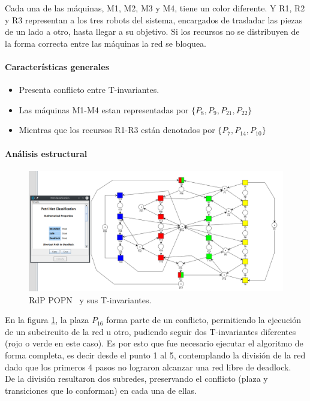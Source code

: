 Cada una de las máquinas, M1, M2, M3 y M4, tiene un color diferente. Y R1, R2 y R3 representan a los tres robots del sistema, encargados de trasladar las piezas de un lado a otro, hasta llegar a su objetivo. Si los recursos no se distribuyen de la forma correcta entre las máquinas la red se bloquea.

\paragraph{Características generales}
    \begin{itemize}
        \item Presenta conflicto entre T-invariantes.
        \item Las máquinas M1-M4 estan representadas por $\{P_8, P_9, P_{21}, P_{22}\}$
        \item Mientras que los recursos R1-R3 están denotados por $\{P_7, P_{14}, P_{10}\}$
    \end{itemize}
   
\paragraph{Análisis estructural}
\hfill \break

\begin{figure}[H]
	\centering
	\includegraphics[width=\textwidth]{Figures/algoritmo3/POP1.png}
	\caption[RdP POPN y sus T-invariantes.]{RdP POPN \footnotemark \ y sus T-invariantes.}
	\label{fig:popntinvariantes}
 \end{figure} 

En la figura \ref{fig:popntinvariantes}, la plaza $P_{16}$ forma parte de un conflicto, permitiendo la ejecución de un subcircuito de la red u otro, pudiendo seguir dos T-invariantes diferentes (rojo o verde en este caso).
Es por esto que fue necesario ejecutar el algoritmo de forma completa, es decir desde el punto 1 al 5, contemplando la división de la red dado que los primeros 4 pasos no lograron alcanzar una red libre de deadlock.\\
De la división resultaron dos subredes, preservando el conflicto (plaza y transiciones que lo conforman) en cada una de ellas.

